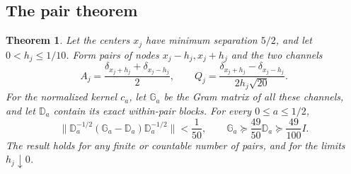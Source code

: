 \documentclass[11pt,letterpaper]{article}
\numberwithin{equation}{section}
\newtheorem{theorem}{Theorem}[section]
\theoremstyle{remark}\newtheorem{remark}[theorem]{Remark}
\begin{document}
\subsection{The pair theorem}
\begin{theorem}\label{thm:pairs}
Let the centers $x_j$ have minimum separation $5/2$, and let $0<h_j\le1/10$. Form pairs of nodes $x_j-h_j,x_j+h_j$ and the two channels
\begin{equation}\label{eq:channels}
A_j=\frac{\delta_{x_j+h_j}+\delta_{x_j-h_j}}2,
\qquad Q_j=\frac{\delta_{x_j+h_j}-\delta_{x_j-h_j}}{2h_j\sqrt{20}}.
\end{equation}
For the normalized kernel $c_a$, let $\mathbb G_a$ be the Gram matrix of all these channels, and let $\mathbb D_a$ contain its exact within-pair blocks. For every $0\le a\le1/2$,
\begin{equation}\label{eq:pairs}
\boxed{\|\mathbb D_a^{-1/2}(\mathbb G_a-\mathbb D_a)\mathbb D_a^{-1/2}\|<\frac1{50},
\qquad
\mathbb G_a\succeq\frac{49}{50}\mathbb D_a\succeq\frac{49}{100}I.}
\end{equation}
The result holds for any finite or countable number of pairs, and for the limits $h_j\downarrow0$.
\end{theorem}
\end{document}
